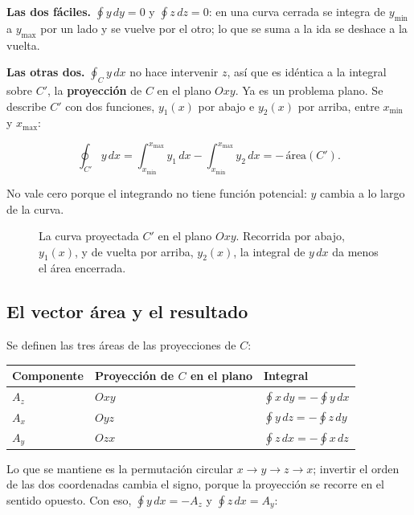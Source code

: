 \documentclass[12pt,a4paper]{article}
\begin{document}
\textbf{Las dos fáciles.} $\oint y\,dy = 0$ y $\oint z\,dz = 0$: en una curva cerrada
se integra de $y_{\min}$ a $y_{\max}$ por un lado y se vuelve por el otro; lo
que se suma a la ida se deshace a la vuelta.

\textbf{Las otras dos.} $\oint_C y\,dx$ no hace intervenir $z$, así que es idéntica
a la integral sobre $C'$, la \textbf{proyección} de $C$ en el plano $Oxy$. Ya es un
problema plano. Se describe $C'$ con dos funciones, $y_1(x)$ por abajo e
$y_2(x)$ por arriba, entre $x_{\min}$ y $x_{\max}$:

\[
\oint_{C'} y\,dx = \int_{x_{\min}}^{x_{\max}} y_1\,dx - \int_{x_{\min}}^{x_{\max}} y_2\,dx
= -\,\text{área}(C') .
\]

\begin{notebox}
No vale cero porque el integrando no tiene función potencial: $y$ cambia a
lo largo de la curva.
\end{notebox}

\begin{figure}[H]
  \centering
  
  \caption{La curva proyectada $C'$ en el plano $Oxy$. Recorrida por abajo, $y_1(x)$, y de vuelta por arriba, $y_2(x)$, la integral de $y\,dx$ da menos el área encerrada.}
\end{figure}

\subsection{El vector área y el resultado}

Se definen las tres áreas de las proyecciones de $C$:

\begin{center}
\renewcommand{\arraystretch}{1.35}
\small
\begin{tabularx}{\textwidth}{l>{\raggedright\arraybackslash}X>{\raggedright\arraybackslash}X}
\toprule
\textbf{Componente} & \textbf{Proyección de $C$ en el plano} & \textbf{Integral} \\
\midrule
$A_z$ & $Oxy$ & $\oint x\,dy = -\oint y\,dx$ \\
$A_x$ & $Oyz$ & $\oint y\,dz = -\oint z\,dy$ \\
$A_y$ & $Ozx$ & $\oint z\,dx = -\oint x\,dz$ \\
\bottomrule
\end{tabularx}
\end{center}

Lo que se mantiene es la permutación circular $x\to y\to z\to x$; invertir el
orden de las dos coordenadas cambia el signo, porque la proyección se recorre
en el sentido opuesto. Con eso, $\oint y\,dx = -A_z$ y $\oint z\,dx = A_y$:
\end{document}
